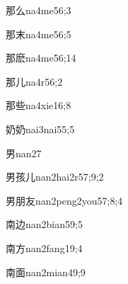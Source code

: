 \begin{verbete}{那么}{na4me5}{6;3}
\end{verbete}

\begin{verbete}{那末}{na4me5}{6;5}
\end{verbete}

\begin{verbete}{那麽}{na4me5}{6;14}
\end{verbete}

\begin{verbete}{那儿}{na4r5}{6;2}
\end{verbete}

\begin{verbete}{那些}{na4xie1}{6;8}
\end{verbete}

\begin{verbete}{奶奶}{nai3nai5}{5;5}
\end{verbete}

\begin{verbete}{男}{nan2}{7}
\end{verbete}

\begin{verbete}{男孩儿}{nan2hai2r5}{7;9;2}
\end{verbete}

\begin{verbete}{男朋友}{nan2peng2you5}{7;8;4}
\end{verbete}

\begin{verbete}{南边}{nan2bian5}{9;5}
\end{verbete}

\begin{verbete}{南方}{nan2fang1}{9;4}
\end{verbete}

\begin{verbete}{南面}{nan2mian4}{9;9}
\end{verbete}

